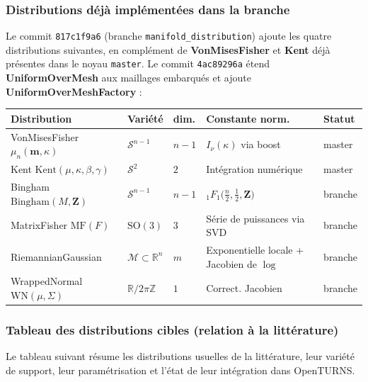 \documentclass[11pt,a4paper]{article}
\begin{document}
\subsubsection{Distributions déjà implémentées dans la branche}

Le commit \texttt{817c1f9a6} (branche \texttt{manifold\_distribution}) ajoute les quatre distributions suivantes, en complément de \textbf{VonMisesFisher} et \textbf{Kent} déjà présentes dans le noyau \texttt{master}. Le commit \texttt{4ac89296a} étend \textbf{UniformOverMesh} aux maillages embarqués et ajoute \textbf{UniformOverMeshFactory} :

\begin{longtable}{@{}>{\raggedright\arraybackslash}p{3.5cm}>{\raggedright\arraybackslash}p{2.4cm}>{\raggedright\arraybackslash}p{1cm}>{\raggedright\arraybackslash}p{4.2cm}>{\raggedright\arraybackslash}p{1.6cm}@{}}
\toprule
\textbf{Distribution} & \textbf{Variété} & \textbf{dim.} & \textbf{Constante norm.} & \textbf{Statut} \\
\midrule
\endhead
VonMisesFisher $\mu_n(\mathbf{m}, \kappa)$
    & $\mathcal{S}^{n-1}$ & $n\!-\!1$
    & $I_\nu(\kappa)$ via boost
    & master \\
Kent $\text{Kent}(\mu, \kappa, \beta, \gamma)$
    & $\mathcal{S}^2$ & $2$
    & Intégration numérique
    & master \\
Bingham $\text{Bingham}(M, \mathbf{Z})$
    & $\mathcal{S}^{n-1}$ & $n\!-\!1$
    & ${}_1F_1\bigl(\tfrac{n}{2}, \tfrac{1}{2}, \mathbf{Z}\bigr)$
    & branche \\
MatrixFisher $\text{MF}(F)$
    & $\text{SO}(3)$ & $3$
    & Série de puissances via SVD
    & branche \\
RiemannianGaussian
    & $\mathcal{M}\!\subset\!\mathbb{R}^n$ & $m$
    & Exponentielle locale + Jacobien de $\log$ & branche \\
WrappedNormal $\text{WN}(\mu, \Sigma)$
    & $\mathbb{R}/2\pi\mathbb{Z}$ & $1$
    & Correct. Jacobien
    & branche \\
\bottomrule
\end{longtable}

\subsubsection{Tableau des distributions cibles (relation à la littérature)}

Le tableau suivant résume les distributions usuelles de la littérature, leur variété de support, leur paramétrisation et l'état de leur intégration dans OpenTURNS.
\end{document}
